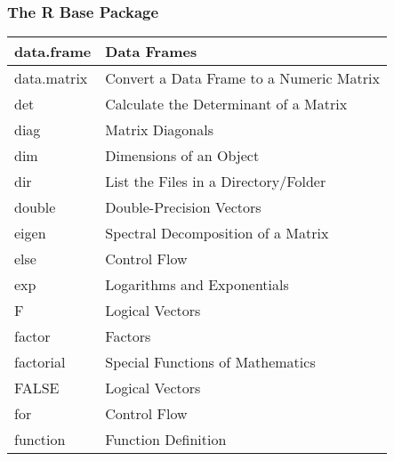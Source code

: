 \documentclass{beamer}
\begin{document}
\begin{frame}
    \frametitle{The R Base Package} 

{\scriptsize
\begin{center}
\begin{tabular}{|l|l|}
 \hline
data.frame &	Data Frames \\ \hline
data.matrix &	Convert a Data Frame to a Numeric Matrix \\ \hline
det &	Calculate the Determinant of a Matrix \\ \hline
diag &	Matrix Diagonals \\ \hline
dim &	Dimensions of an Object \\ \hline
dir &	List the Files in a Directory/Folder \\ \hline
double &	Double-Precision Vectors \\ \hline
eigen &	Spectral Decomposition of a Matrix \\ \hline
else &	Control Flow \\ \hline
exp &	Logarithms and Exponentials \\ \hline
F &	Logical Vectors \\ \hline
factor &	Factors \\ \hline
factorial &	Special Functions of Mathematics \\ \hline
FALSE &	Logical Vectors \\ \hline
for &	Control Flow \\ \hline
function &	Function Definition \\ \hline
\end{tabular}
\end{center}
}

\end{frame}
\end{document}
